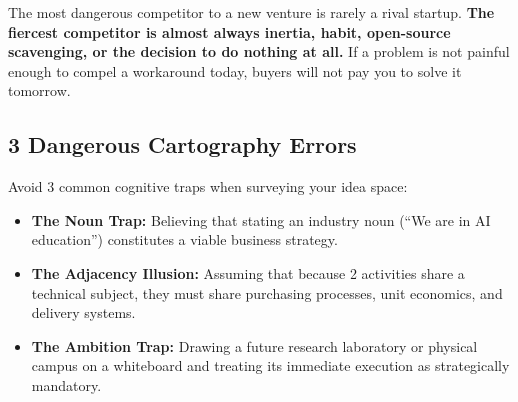 The most dangerous competitor to a new venture is rarely a rival startup. \textbf{The fiercest competitor is almost always inertia, habit, open-source scavenging, or the decision to do nothing at all.} If a problem is not painful enough to compel a workaround today, buyers will not pay you to solve it tomorrow.

\subsection{3 Dangerous Cartography Errors}

Avoid 3 common cognitive traps when surveying your idea space:

\begin{itemize}[leftmargin=11pt,itemsep=2pt,topsep=1.5pt,parsep=0pt]
  \item \textbf{The Noun Trap:} Believing that stating an industry noun (``We are in AI education'') constitutes a viable business strategy.
  \item \textbf{The Adjacency Illusion:} Assuming that because 2 activities share a technical subject, they must share purchasing processes, unit economics, and delivery systems.
  \item \textbf{The Ambition Trap:} Drawing a future research laboratory or physical campus on a whiteboard and treating its immediate execution as strategically mandatory.
\end{itemize}
